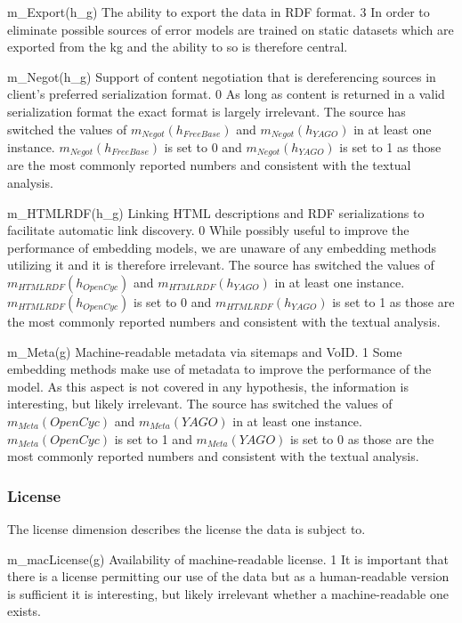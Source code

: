 \weighttable
{m_{Export}(h_g)}
{The ability to export the data in RDF format.}
{3}
{In order to eliminate possible sources of error models are trained on static datasets which are exported from the \gls{kg} and the ability to so is therefore central.}
{}

\weighttable
{m_{Negot}(h_g)}
{Support of content negotiation that is dereferencing sources in client's preferred serialization format.}
{0}
{As long as content is returned in a valid serialization format the exact format is largely irrelevant.}
{The source has switched the values of $m_{Negot}(h_{FreeBase})$ and $m_{Negot}(h_{YAGO})$ in at least one instance. $m_{Negot}(h_{FreeBase})$ is set to 0 and $m_{Negot}(h_{YAGO})$ is set to 1 as those are the most commonly reported numbers and consistent with the textual analysis.}

\weighttable
{m_{HTMLRDF}(h_g)}
{Linking HTML descriptions and RDF serializations to facilitate automatic link discovery.}
{0}
{While possibly useful to improve the performance of embedding models, we are unaware of any embedding methods utilizing it and it is therefore irrelevant.}
{The source has switched the values of $m_{HTMLRDF}(h_{OpenCyc})$ and $m_{HTMLRDF}(h_{YAGO})$ in at least one instance. $m_{HTMLRDF}(h_{OpenCyc})$ is set to 0 and $m_{HTMLRDF}(h_{YAGO})$ is set to 1 as those are the most commonly reported numbers and consistent with the textual analysis.}

\weighttable
{m_{Meta}(g)}
{Machine-readable metadata via sitemaps and VoID.}
{1}
{Some embedding methods make use of metadata to improve the performance of the model. As this aspect is not covered in any hypothesis, the information is interesting, but likely irrelevant.}
{The source has switched the values of $m_{Meta}(OpenCyc)$ and $m_{Meta}(YAGO)$ in at least one instance. $m_{Meta}(OpenCyc)$ is set to 1 and $m_{Meta}(YAGO)$ is set to 0 as those are the most commonly reported numbers and consistent with the textual analysis.}

\subsubsection{License}
The license dimension describes the license the data is subject to.

\weighttable
{m_{macLicense}(g)}
{Availability of machine-readable license.}
{1}
{It is important that there is a license permitting our use of the data but as a human-readable version is sufficient it is interesting, but likely irrelevant whether a machine-readable one exists.}
{}

